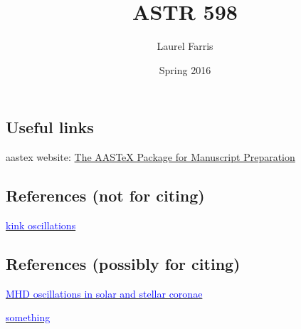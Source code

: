 \documentclass[12pt]{article}
\title{ASTR 598}
\author{Laurel Farris}
\date{Spring 2016}
\begin{document}
\maketitle

\subsection*{Useful links}

aastex website: \textcolor{blue}
{\href{http://aas.org/aastex/aastex-package-manuscript-preparation}
{The AASTeX Package for Manuscript Preparation}}

\subsection*{References (not for citing)}

\href{http://home.physics.ucla.edu/calendar/conferences/cmpd/talks/cowley.pdf}
{\textcolor{blue}{kink oscillations}}

\subsection*{References (possibly for citing)}
\href{http://www2.warwick.ac.uk/fac/sci/physics/research/cfsa/people/valery/research/eprints/n07.pdf}{\textcolor{blue}{MHD
oscillations in solar and stellar coronae}}

\href{http://www.differencebetween.com/difference-between-oscillation-and-vs-wave/}
{\textcolor{blue}{something}}
\end{document}
